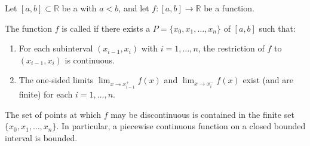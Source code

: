 \begin{definition} \label{definition:piecewise_continuous_function_on_a_closed_interval}
Let $[a,b] \subset \mathbb{R}$ be a  with $a < b$, and let $f : [a,b] \to \mathbb{R}$ be a function.

The function $f$ is called  if there exists a  $P = \{x_0, x_1, \dots, x_n\}$ of $[a,b]$ such that:
\begin{enumerate}
  \item For each subinterval $(x_{i-1}, x_i)$ with $i = 1, \dots, n$, the restriction of $f$ to $(x_{i-1}, x_i)$ is continuous.
  \item The one-sided limits $\lim_{x \to x_{i-1}^+} f(x)$ and $\lim_{x \to x_i^-} f(x)$ exist (and are finite) for each $i = 1, \dots, n$.
\end{enumerate}

The set of points at which $f$ may be discontinuous is contained in the finite set $\{x_0, x_1, \dots, x_n\}$. In particular, a piecewise continuous function on a closed bounded interval is bounded.
\end{definition}
